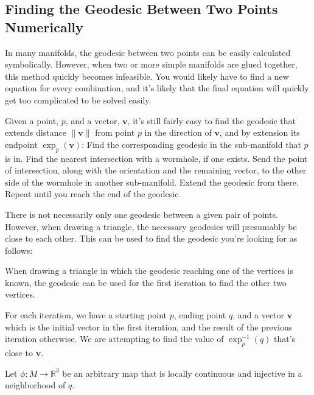 \subsection{Finding the Geodesic Between Two Points Numerically}


In many manifolds, the geodesic between two points can be easily calculated symbolically. However, when two or more simple manifolds are glued together, this method quickly becomes infeasible. You would likely have to find a new equation for every combination, and it's likely that the final equation will quickly get too complicated to be solved easily.

Given a point, $p$, and a vector, $\textbf{v}$, it's still fairly easy to find the geodesic that extends distance $\|\textbf{v}\|$ from point $p$ in the direction of $\textbf{v}$, and by extension its endpoint $\exp_p(\textbf{v})$: Find the corresponding geodesic in the sub-manifold that $p$ is in. Find the nearest intersection with a wormhole, if one exists. Send the point of intersection, along with the orientation and the remaining vector, to the other side of the wormhole in another sub-manifold. Extend the geodesic from there. Repeat until you reach the end of the geodesic.

There is not necessarily only one geodesic between a given pair of points. However, when drawing a triangle, the necessary geodesics will presumably be close to each other. This can be used to find the geodesic you're looking for as follows:

When drawing a triangle in which the geodesic reaching one of the vertices is known, the geodesic can be used for the first iteration to find the other two vertices.

For each iteration, we have a starting point $p$, ending point $q$, and a vector $\textbf{v}$ which is the initial vector in the first iteration, and the result of the previous iteration otherwise. We are attempting to find the value of $\exp^{-1}_p(q)$ that's close to $\textbf{v}$.

Let $\phi:M \to \mathbb{R}^3$ be an arbitrary map that is locally continuous and injective in a neighborhood of $q$. %

